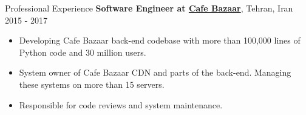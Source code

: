 \documentclass{resume} %
\begin{document}
\begin{rSection}{Professional Experience}
	{\bf Software Engineer at \href{https://cafebazaar.ir/app?l=en}{Cafe Bazaar}}, Tehran, Iran \hfill 2015 - 2017
	\smallskip
	\vspace{-0.5em}
	\begin{itemize}[leftmargin=3mm]
		\setlength{\itemsep}{1pt}
		\setlength{\parskip}{0pt}
		\setlength{\parsep}{0pt}
		\renewcommand\labelitemi{$\cdot$}

		\item Developing Cafe Bazaar back-end codebase with more than 100,000 lines of 
      Python code and 30 million users.
		\item System owner of Cafe Bazaar CDN and parts of the back-end. Managing these systems 
      on more than 15 servers.
		\item Responsible for code reviews and system maintenance.
	\end{itemize}
	
\end{rSection}

\end{document}
